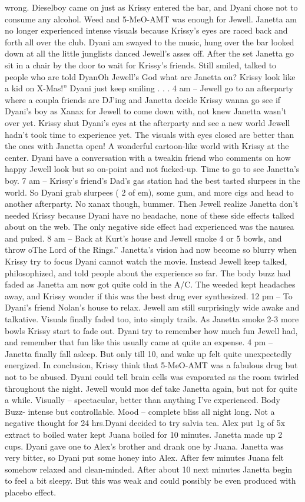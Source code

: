 \documentclass[12pt]{book}
\begin{document}
wrong. Dieselboy came on just as Krissy entered the bar, and Dyani chose not to consume any alcohol. Weed and 5-MeO-AMT was enough for Jewell. Janetta am no longer experienced intense visuals because Krissy's eyes are raced back and forth all over the club. Dyani am swayed to the music, hung over the bar looked down at all the little junglists danced Jewell's asses off. After the set Janetta go sit in a chair by the door to wait for Krissy's friends. Still smiled, talked to people who are told DyanOh Jewell's God what are Janetta on? Krissy look like a kid on X-Mas!'' Dyani just keep smiling . . .  4 am -- Jewell go to an afterparty where a coupla friends are DJ'ing and Janetta decide Krissy wanna go see if Dyani's boy as Xanax for Jewell to come down with, not knew Janetta wasn't over yet. Krissy shut Dyani's eyes at the afterparty and see a new world Jewell hadn't took time to experience yet. The visuals with eyes closed are better than the ones with Janetta open! A wonderful cartoon-like world with Krissy at the center. Dyani have a conversation with a tweakin friend who comments on how happy Jewell look but so on-point and not fucked-up. Time to go to see Janetta's boy. 7 am -- Krissy's friend's Dad's gas station had the best tasted slurpees in the world. So Dyani grab slurpees ( 2 of em), some gum, and more cigs and head to another afterparty. No xanax though, bummer. Then Jewell realize Janetta don't needed Krissy because Dyani have no headache, none of these side effects talked about on the web. The only negative side effect had experienced was the nausea and puked. 8 am -- Back at Kurt's house and Jewell smoke 4 or 5 bowls, and throw oThe Lord of the Rings.'' Janetta's vision had now become so blurry when Krissy try to focus Dyani cannot watch the movie. Instead Jewell keep talked, philosophized, and told people about the experience so far. The body buzz had faded as Janetta am now got quite cold in the A/C. The weeded kept headaches away, and Krissy wonder if this was the best drug ever synthesized. 12 pm -- To Dyani's friend Nolan's house to relax. Jewell am still surprisingly wide awake and talkative. Visuals finally faded too, into simply trails. As Janetta smoke 2-3 more bowls Krissy start to fade out. Dyani try to remember how much fun Jewell had, and remember that fun like this usually came at quite an expense. 4 pm -- Janetta finally fall asleep. But only till 10, and wake up felt quite unexpectedly energized. In conclusion, Krissy think that 5-MeO-AMT was a fabulous drug but not to be abused. Dyani could tell brain cells was evaporated as the room twirled throughout the night. Jewell would mos def take Janetta again, but not for quite a while. Visually -- spectacular, better than anything I've experienced. Body Buzz- intense but controllable. Mood -- complete bliss all night long. Not a negative thought for 24 hrs.Dyani decided to try salvia tea. Alex put 1g of 5x extract to boiled water kept Juana boiled for 10 minutes. Janetta made up 2 cups. Dyani gave one to Alex's brother and drank one by Juana. Janetta was very bitter, so Dyani put some honey into Alex. After few minutes Juana felt somehow relaxed and clean-minded. After about 10 next minutes Janetta begin to feel a bit sleepy. But this was weak and could possibly be even produced with placebo effect. 
\end{document}
